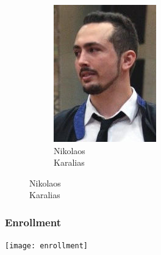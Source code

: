 \documentclass[aspectratio=169]{beamer}
\begin{document}
\begin{frame}
\begin{figure}
\begin{subfigure}[b]{0.14\linewidth}
			\includegraphics[width=\linewidth]{picture_nikos}
			\caption*{Nikolaos\\Karalias}
		\end{subfigure}
	\end{figure}
\end{frame}


\begin{frame}
	\frametitle{Enrollment}
	\centering
	\texttt{[image: enrollment]}
\end{frame}

\end{document}
